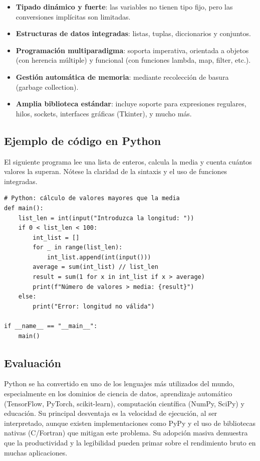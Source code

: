 \begin{itemize}
  \item \textbf{Tipado dinámico y fuerte}: las variables no tienen tipo fijo, pero las conversiones implícitas son limitadas.
  \item \textbf{Estructuras de datos integradas}: listas, tuplas, diccionarios y conjuntos.
  \item \textbf{Programación multiparadigma}: soporta imperativa, orientada a objetos (con herencia múltiple) y funcional (con funciones lambda, map, filter, etc.).
  \item \textbf{Gestión automática de memoria}: mediante recolección de basura (garbage collection).
  \item \textbf{Amplia biblioteca estándar}: incluye soporte para expresiones regulares, hilos, sockets, interfaces gráficas (Tkinter), y mucho más.
\end{itemize}

\subsection{Ejemplo de código en Python}

El siguiente programa lee una lista de enteros, calcula la media y cuenta cuántos valores la superan. Nótese la claridad de la sintaxis y el uso de funciones integradas.

\begin{verbatim}
# Python: cálculo de valores mayores que la media
def main():
    list_len = int(input("Introduzca la longitud: "))
    if 0 < list_len < 100:
        int_list = []
        for _ in range(list_len):
            int_list.append(int(input()))
        average = sum(int_list) // list_len
        result = sum(1 for x in int_list if x > average)
        print(f"Número de valores > media: {result}")
    else:
        print("Error: longitud no válida")

if __name__ == "__main__":
    main()
\end{verbatim}

\subsection{Evaluación}

Python se ha convertido en uno de los lenguajes más utilizados del mundo, especialmente en los dominios de ciencia de datos, aprendizaje automático (TensorFlow, PyTorch, scikit-learn), computación científica (NumPy, SciPy) y educación. Su principal desventaja es la velocidad de ejecución, al ser interpretado, aunque existen implementaciones como PyPy y el uso de bibliotecas nativas (C/Fortran) que mitigan este problema. Su adopción masiva demuestra que la productividad y la legibilidad pueden primar sobre el rendimiento bruto en muchas aplicaciones.

